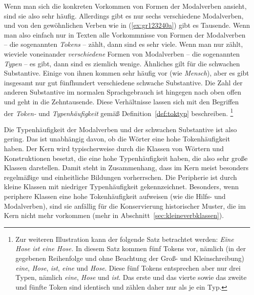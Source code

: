 Wenn man sich die konkreten Vorkommen von Formen der Modalverben ansieht, sind sie also sehr häufig.
Allerdings gibt es nur sechs verschiedene Modalverben, und von den gewöhnlichen Verben wie in (\ref{ex:gr123240a}) gibt es Tausende.
Wenn man also einfach nur in Texten alle Vorkommnisse von Formen der Modalverben -- die sogenannten \textit{Tokens} -- zählt, dann sind es sehr viele.
Wenn man nur zählt, wieviele voneinander \textit{verschiedene} Formen von Modalverben -- die sogenannten \textit{Typen} -- es gibt, dann sind es ziemlich wenige.
Ähnliches gilt für die schwachen Substantive.
Einige von ihnen kommen sehr häufig vor (wie \textit{Mensch}), aber es gibt insgesamt nur gut fünfhundert verschiedene schwache Substantive.
Die Zahl der anderen Substantive im normalen Sprachgebrauch ist hingegen nach oben offen und geht in die Zehntausende.
Diese Verhältnisse lassen sich mit den Begriffen der \textit{Token-} und \textit{Typenhäufigkeit} gemäß Definition~\ref{def:toktyp} beschreiben.%
\footnote{Zur weiteren Illustration kann der folgende Satz betrachtet werden:
\textit{Eine Hose ist eine Hose.}
In diesem Satz kommen fünf Tokens vor, nämlich (in der gegebenen Reihenfolge und ohne Beachtung der Groß- und Kleinschreibung) \textit{eine}, \textit{Hose}, \textit{ist}, \textit{eine} und \textit{Hose}.
Diese fünf Tokens entsprechen aber nur drei Typen, nämlich \textit{eine}, \textit{Hose} und \textit{ist}.
Das erste und das vierte sowie das zweite und fünfte Token sind identisch und zählen daher nur als je ein Typ.
}


Die Typenhäufigkeit der Modalverben und der schwachen Substantive ist also gering.
Das ist unabhängig davon, ob die Wörter eine hohe Tokenhäufigkeit haben.
Der Kern wird typischerweise durch die Klassen von Wörtern und Konstruktionen besetzt, die eine hohe Typenhäufigkeit haben, die also sehr große Klassen darstellen.
Damit steht in Zusammenhang, dass im Kern meist besonders regelmäßige und einheitliche Bildungen vorherrschen.
Die Peripherie ist durch kleine Klassen mit niedriger Typenhäufigkeit gekennzeichnet.
Besonders, wenn periphere Klassen eine hohe Tokenhäufigkeit aufweisen (wie die Hilfs- und Modalverben), sind sie anfällig für die Konservierung historischer Muster, die im Kern nicht mehr vorkommen (mehr in Abschnitt~\ref{sec:kleineverbklassen}).


